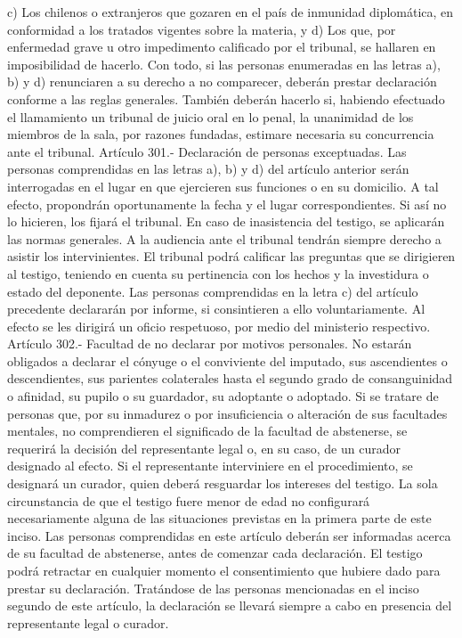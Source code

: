     c) Los chilenos o extranjeros que gozaren en el país de inmunidad diplomática, en conformidad a los tratados vigentes sobre la materia, y
    d) Los que, por enfermedad grave u otro impedimento calificado por el tribunal, se hallaren en imposibilidad de hacerlo.
    Con todo, si las personas enumeradas en las letras a), b) y d) renunciaren a su derecho a no comparecer, deberán prestar declaración conforme a las reglas generales. También deberán hacerlo si, habiendo efectuado el llamamiento un tribunal de juicio oral en lo penal, la unanimidad de los miembros de la sala, por razones fundadas, estimare necesaria su concurrencia ante el tribunal.
    Artículo 301.- Declaración de personas exceptuadas. Las personas comprendidas en las letras a), b) y d) del artículo anterior serán interrogadas en el lugar en que ejercieren sus funciones o en su domicilio. A tal efecto, propondrán oportunamente la fecha y el lugar correspondientes. Si así no lo hicieren, los fijará el tribunal. En caso de inasistencia del testigo, se aplicarán las normas generales. A la audiencia ante el tribunal tendrán siempre derecho a asistir los intervinientes. El tribunal podrá calificar las preguntas que se dirigieren al testigo, teniendo en cuenta su pertinencia con los hechos y la investidura o estado del deponente.
    Las personas comprendidas en la letra c) del artículo precedente declararán por informe, si consintieren a ello voluntariamente. Al efecto se les dirigirá un oficio respetuoso, por medio del ministerio respectivo.
    Artículo 302.- Facultad de no declarar por motivos personales. No estarán obligados a declarar el cónyuge o el conviviente del imputado, sus ascendientes o descendientes, sus parientes colaterales hasta el segundo grado de consanguinidad o afinidad, su pupilo o su guardador, su adoptante o adoptado.
    Si se tratare de personas que, por su inmadurez o por insuficiencia o alteración de sus facultades mentales, no comprendieren el significado de la facultad de abstenerse, se requerirá la decisión del representante legal o, en su caso, de un curador
designado al efecto. Si el representante interviniere en el procedimiento, se designará un curador, quien deberá resguardar los intereses del testigo. La sola circunstancia de que el testigo fuere menor de edad no configurará necesariamente alguna de las situaciones previstas en la primera parte de este inciso.
    Las personas comprendidas en este artículo deberán ser informadas acerca de su facultad de abstenerse, antes de comenzar cada declaración. El testigo podrá retractar en cualquier momento el consentimiento que hubiere dado para prestar su declaración. Tratándose de las personas mencionadas en el inciso segundo de este artículo, la declaración se llevará siempre a cabo en presencia del representante legal o curador.

